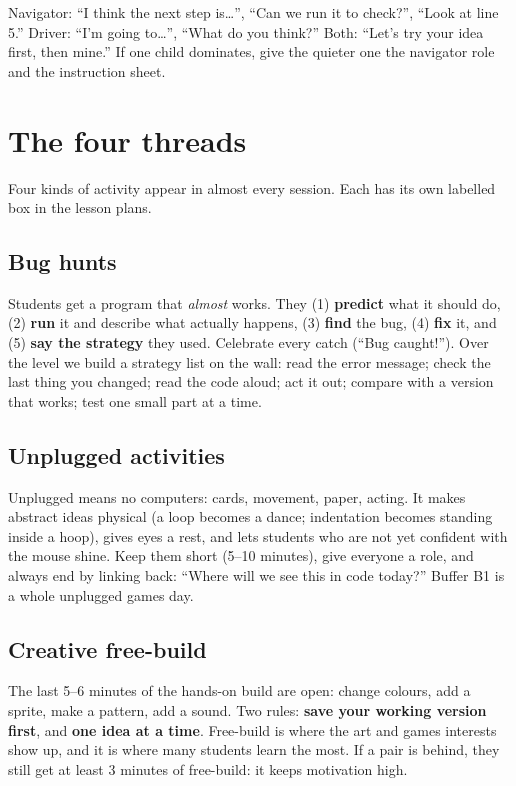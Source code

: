 \documentclass[level=1,teacher]{kidscode}
\begin{document}
\begin{tip}
Navigator: \enquote{I think the next step is\dots}, \enquote{Can we run it to check?}, \enquote{Look at line 5.}
Driver: \enquote{I'm going to\dots}, \enquote{What do you think?}
Both: \enquote{Let's try your idea first, then mine.}
If one child dominates, give the quieter one the navigator role and the instruction sheet.
\end{tip}

\section{The four threads}
Four kinds of activity appear in almost every session. Each has its own labelled box in the lesson plans.

\subsection{Bug hunts}
\begin{bughunt}
Students get a program that \emph{almost} works. They (1) \textbf{predict} what it should do, (2) \textbf{run}
it and describe what actually happens, (3) \textbf{find} the bug, (4) \textbf{fix} it, and (5) \textbf{say
the strategy} they used. Celebrate every catch (\enquote{Bug caught!}). Over the level we build a
strategy list on the wall: read the error message; check the last thing you changed; read the code aloud;
act it out; compare with a version that works; test one small part at a time.
\end{bughunt}

\subsection{Unplugged activities}
\begin{unplugged}
Unplugged means no computers: cards, movement, paper, acting. It makes abstract ideas physical
(a loop becomes a dance; indentation becomes standing inside a hoop), gives eyes a rest, and lets
students who are not yet confident with the mouse shine. Keep them short (5--10 minutes), give
everyone a role, and always end by linking back: \enquote{Where will we see this in code today?}
Buffer B1 is a whole unplugged games day.
\end{unplugged}

\subsection{Creative free-build}
\begin{freebuild}
The last 5--6 minutes of the hands-on build are open: change colours, add a sprite, make a pattern,
add a sound. Two rules: \textbf{save your working version first}, and \textbf{one idea at a time}.
Free-build is where the art and games interests show up, and it is where many students learn the most.
If a pair is behind, they still get at least 3 minutes of free-build: it keeps motivation high.
\end{freebuild}
\end{document}

